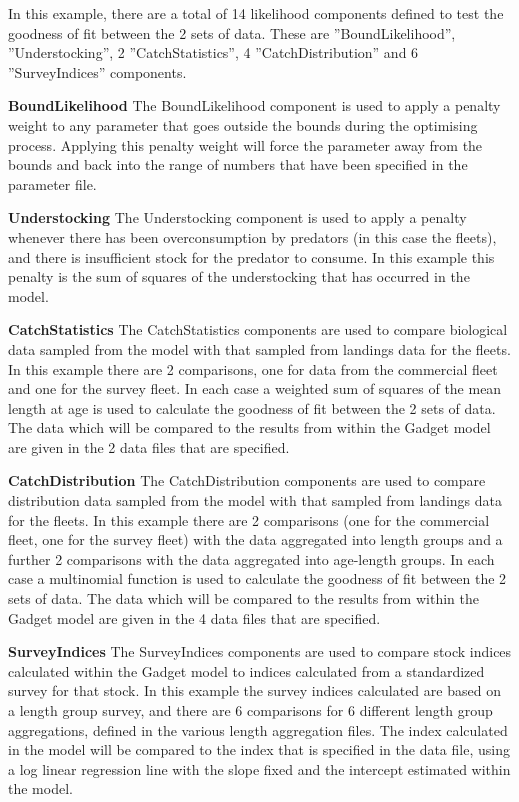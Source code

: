 \documentclass[10pt,titlepage]{article}
\begin{document}
\bigskip
In this example, there are a total of 14 likelihood components defined to test the goodness of fit between the 2 sets of data.  These are ''BoundLikelihood'', ''Understocking'', 2 ''CatchStatistics'', 4 ''CatchDistribution'' and 6 ''SurveyIndices'' components.

\bigskip
{\bf BoundLikelihood}\newline
The BoundLikelihood component is used to apply a penalty weight to any parameter that goes outside the bounds during the optimising process.  Applying this penalty weight will force the parameter away from the bounds and back into the range of numbers that have been specified in the parameter file.

\bigskip
{\bf Understocking}\newline
The Understocking component is used to apply a penalty whenever there has been overconsumption by predators (in this case the fleets), and there is insufficient stock for the predator to consume.  In this example this penalty is the sum of squares of the understocking that has occurred in the model.

\bigskip
{\bf CatchStatistics}\newline
The CatchStatistics components are used to compare biological data sampled from the model with that sampled from landings data for the fleets.  In this example there are 2 comparisons, one for data from the commercial fleet and one for the survey fleet.  In each case a weighted sum of squares of the mean length at age is used to calculate the goodness of fit between the 2 sets of data.  The data which will be compared to the results from within the Gadget model are given in the 2 data files that are specified.

\bigskip
{\bf CatchDistribution}\newline
The CatchDistribution components are used to compare distribution data sampled from the model with that sampled from landings data for the fleets.  In this example there are 2 comparisons (one for the commercial fleet, one for the survey fleet) with the data aggregated into length groups and a further 2 comparisons with the data aggregated into age-length groups.  In each case a multinomial function is used to calculate the goodness of fit between the 2 sets of data.  The data which will be compared to the results from within the Gadget model are given in the 4 data files that are specified.

\bigskip
{\bf SurveyIndices}\newline
The SurveyIndices components are used to compare stock indices calculated within the Gadget model to indices calculated from a standardized survey for that stock.  In this example the survey indices calculated are based on a length group survey, and there are 6 comparisons for 6 different length group aggregations, defined in the various length aggregation files.  The index calculated in the model will be compared to the index that is specified in the data file, using a log linear regression line with the slope fixed and the intercept estimated within the model.
\end{document}
